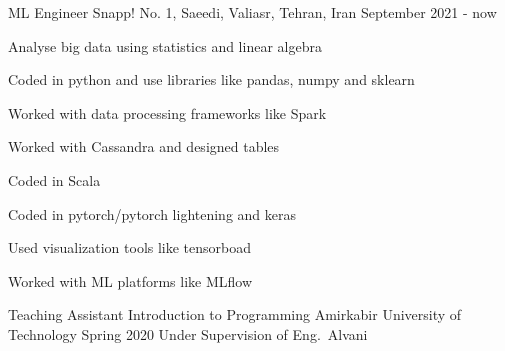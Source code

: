 \begin{cventries}
  \cventry
    {ML Engineer} %
    {Snapp!} %
    {No. 1, Saeedi, Valiasr, Tehran, Iran} %
    {September 2021 - now} %
    {
      \begin{cvitems} %
        \item {Analyse big data using statistics and linear algebra}
        \item {Coded in python and use libraries like pandas, numpy and sklearn}
        \item {Worked with data processing frameworks like Spark}
        \item {Worked with Cassandra and designed tables}
        \item {Coded in Scala}
        \item {Coded in pytorch/pytorch lightening and keras}
        \item {Used visualization tools like tensorboad}
        \item {Worked with ML platforms like MLflow}
      \end{cvitems}
    }

\end{cventries}


\begin{cventries}

  \cventry
    {Teaching Assistant} %
    {Introduction to Programming} %
    {Amirkabir University of Technology} %
    {Spring 2020} %
    {Under Supervision of Eng.~Alvani}


\end{cventries}
